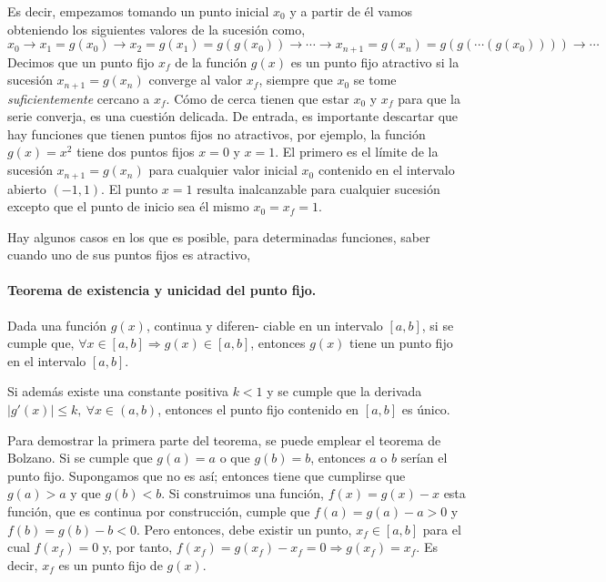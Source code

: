 Es decir, empezamos tomando un punto inicial $x_0$ y a partir de él vamos obteniendo los siguientes valores de la sucesión como,
\begin{equation*}
x_0\rightarrow x_1=g(x_0)\rightarrow x_2=g(x_1)=g\left(g(x_0)\right) \rightarrow \cdots \rightarrow x_{n+1}=g(x_{n})=g\left( g\left( \cdots\left( g(x_0)\right)\right)\right) \rightarrow \cdots
\end{equation*}
Decimos que un punto fijo $x_f$ de la función $g(x)$ es un punto fijo atractivo si la sucesión $x_{n+1}=g(x_n)$ converge al valor $x_f$, siempre que $x_0$ se tome \emph{suficientemente} cercano a $x_f$. Cómo de cerca tienen que estar $x_0$ y $x_f$ para que la serie converja, es una cuestión delicada. De entrada, es importante descartar que hay funciones que tienen puntos fijos no atractivos, por ejemplo, la función $g(x)=x^2$ tiene dos puntos fijos $x=0$ y $x=1$. El primero es el límite de la sucesión $x_{n+1}=g(x_n)$ para cualquier valor inicial $x_0$ contenido en el intervalo abierto $(-1,  1)$. El punto $x=1$ resulta inalcanzable para cualquier sucesión excepto que el punto de inicio sea él mismo $x_0=x_f=1$.

Hay algunos casos en los que  es posible, para determinadas funciones, saber cuando uno de sus puntos fijos es atractivo,

\paragraph{Teorema de existencia y unicidad del punto fijo.} Dada una función $g(x)$,  continua y diferen-\- ciable en un intervalo $[a, b]$, si se cumple que, $\forall x \in [a, b] \Rightarrow g(x)\in [a,b]$,  entonces $g(x)$ tiene un punto fijo en el intervalo $[a, b]$. 

Si además existe una constante positiva $k < 1$  y se  cumple que  la derivada $\vert g'(x) \vert \leq k, \  \forall x \in (a, b)$, entonces el punto fijo contenido en $[a,b]$ es único. 

Para demostrar la primera parte del teorema, se puede emplear el teorema de Bolzano. Si se cumple que $g(a)=a$ o que  $g(b)=b$, entonces $a$ o $b$ serían el punto fijo. Supongamos que no es así;  entonces tiene que cumplirse que $g(a)>a$ y que $g(b)<b$. Si construimos una función, $f(x)=g(x)-x$ esta función, que es continua por construcción, cumple que $f(a)=g(a)-a>0$ y $f(b)=g(b)-b<0$. Pero entonces, debe existir un punto, $x_f \in [a, b]$ para el cual $f(x_f)=0$ y, por tanto, $f(x_f)=g(x_f)-x_f=0 \Rightarrow g(x_f)=x_f$. Es decir, $x_f$ es un punto fijo de $g(x)$.

